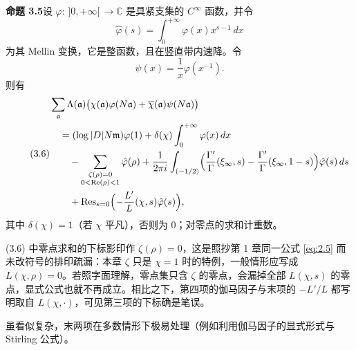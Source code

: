 \par\medskip\noindent\textbf{命题 3.5}\quad 设 $\varphi\colon\,]0,+\infty[\,\to\mathbb{C}$ 是具紧支集的 $C^\infty$ 函数，并令
\[
\hat\varphi(s)=\int_0^{+\infty}\varphi(x)x^{s-1}\,dx
\]
为其 Mellin 变换，它是整函数，且在竖直带内速降。令
\[
\psi(x)=\frac{1}{x}\varphi(x^{-1}).
\]
则有
\begin{equation}\tag{3.6}\label{c2:eq:3.6}
\begin{aligned}
&\sum_{\mathfrak{a}}\Lambda(\mathfrak{a})\bigl(\chi(\mathfrak{a})\varphi(N\mathfrak{a})+\overline{\chi}(\mathfrak{a})\psi(N\mathfrak{a})\bigr)\\
&\quad=(\log|D|N\mathfrak{m})\varphi(1)+\delta(\chi)\int_0^{+\infty}\varphi(x)\,dx\\
&\qquad-\sum_{\substack{\zeta(\rho)=0\\ 0<\operatorname{Re}(\rho)<1}}\hat\varphi(\rho)
+\frac{1}{2\pi i}\int_{(-1/2)}\Bigl(\frac{\Gamma'}{\Gamma}(\xi_\infty,s)-\frac{\Gamma'}{\Gamma}(\xi_\infty,1-s)\Bigr)\hat\varphi(s)\,ds\\
&\qquad+\operatorname{Res}_{s=0}\Bigl(-\frac{L'}{L}(\chi,s)\hat\varphi(s)\Bigr),
\end{aligned}
\end{equation}
其中 $\delta(\chi)=1$（若 $\chi$ 平凡），否则为 $0$；对零点的求和计重数。

\begin{annote}
(3.6) 中零点求和的下标影印作 $\zeta(\rho)=0$，这是照抄第 1 章同一公式 \eqref{eq:2.5} 而未改符号的排印疏漏：本章 $\zeta$ 只是 $\chi=1$ 时的特例，一般情形应写成 $L(\chi,\rho)=0$。若照字面理解，零点集只含 $\zeta$ 的零点，会漏掉全部 $L(\chi,s)$ 的零点，显式公式也就不再成立。相比之下，第四项的伽马因子与末项的 $-L'/L$ 都写明取自 $L(\chi,\cdot)$，可见第三项的下标确是笔误。
\par\vspace{0.15em}{\raggedleft 【来源：原书第 1 章显式公式 (2.5) 逐字对照（A）；Iwaniec--Kowalski 前引书显式公式一节（A）】\par}
\end{annote}

虽看似复杂，末两项在多数情形下极易处理（例如利用伽马因子的显式形式与 Stirling 公式）。

